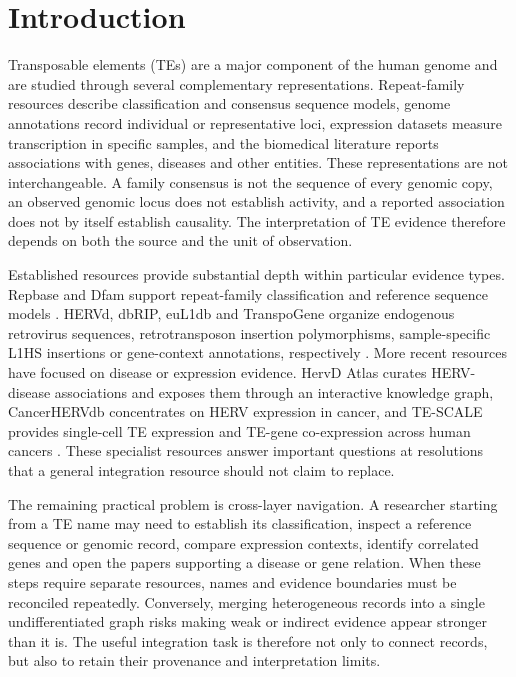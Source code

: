 \section{Introduction}

Transposable elements (TEs) are a major component of the human genome and are studied through several complementary representations. Repeat-family resources describe classification and consensus sequence models, genome annotations record individual or representative loci, expression datasets measure transcription in specific samples, and the biomedical literature reports associations with genes, diseases and other entities. These representations are not interchangeable. A family consensus is not the sequence of every genomic copy, an observed genomic locus does not establish activity, and a reported association does not by itself establish causality. The interpretation of TE evidence therefore depends on both the source and the unit of observation.

Established resources provide substantial depth within particular evidence types. Repbase and Dfam support repeat-family classification and reference sequence models \citep{Bao2015Repbase,Kojima2018HumanRepbase,Wheeler2013Dfam}. HERVd, dbRIP, euL1db and TranspoGene organize endogenous retrovirus sequences, retrotransposon insertion polymorphisms, sample-specific L1HS insertions or gene-context annotations, respectively \citep{Paces2002HERVd,Wang2006dbRIP,Mir2015euL1db,Levy2008TranspoGene}. More recent resources have focused on disease or expression evidence. HervD Atlas curates HERV-disease associations and exposes them through an interactive knowledge graph, CancerHERVdb concentrates on HERV expression in cancer, and TE-SCALE provides single-cell TE expression and TE-gene co-expression across human cancers \citep{Li2024HervDAtlas,Stricker2023CancerHERVdb,Meng2026TESCALE}. These specialist resources answer important questions at resolutions that a general integration resource should not claim to replace.

The remaining practical problem is cross-layer navigation. A researcher starting from a TE name may need to establish its classification, inspect a reference sequence or genomic record, compare expression contexts, identify correlated genes and open the papers supporting a disease or gene relation. When these steps require separate resources, names and evidence boundaries must be reconciled repeatedly. Conversely, merging heterogeneous records into a single undifferentiated graph risks making weak or indirect evidence appear stronger than it is. The useful integration task is therefore not only to connect records, but also to retain their provenance and interpretation limits.

